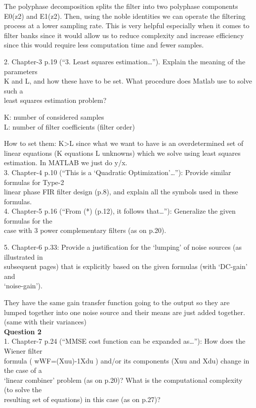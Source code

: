 \documentclass[
  a4paper,
  ,captions=tableheading
]{scrartcl}
\begin{document}
The polyphase decomposition splits the filter into two polyphase
components E0(z2) and E1(z2). Then, using the noble identities we can
operate the filtering process at a lower sampling rate. This is very
helpful especially when it comes to filter banks since it would allow us
to reduce complexity and increase efficiency since this would require
less computation time and fewer samples.

2. Chapter-3 p.19 (``3. Least squares estimation\ldots''). Explain the
meaning of the parameters\\
K and L, and how these have to be set. What procedure does Matlab use to
solve such a\\
least squares estimation problem?

K: number of considered samples\\
L: number of filter coefficients (filter order)

How to set them: K\textgreater L since what we want to have is an
overdetermined set of linear equations (K equations L unknowns) which we
solve using least squares estimation. In MATLAB we just do y/x.\\
3. Chapter-4 p.10 (``This is a `Quadratic Optimization'\ldots{}''):
Provide similar formulas for Type-2\\
linear phase FIR filter design (p.8), and explain all the symbols used
in these formulas.\\
4. Chapter-5 p.16 (``From (*) (p.12), it follows that\ldots''):
Generalize the given formulas for the\\
case with 3 power complementary filters (as on p.20).

5. Chapter-6 p.33: Provide a justification for the `lumping' of noise
sources (as illustrated in\\
subsequent pages) that is explicitly based on the given formulas (with
`DC-gain' and\\
`noise-gain').

They have the same gain transfer function going to the output so they
are lumped together into one noise source and their means are just added
together. (same with their variances)\\
\textbf{Question 2}\\
1. Chapter-7 p.24 (``MMSE cost function can be expanded as\ldots{}''):
How does the Wiener filter\\
formula ( wWF=(Xuu)-1Xdu ) and/or its components (Xuu and Xdu) change in
the case of a\\
`linear combiner' problem (as on p.20)? What is the computational
complexity (to solve the\\
resulting set of equations) in this case (as on p.27)?
\end{document}
